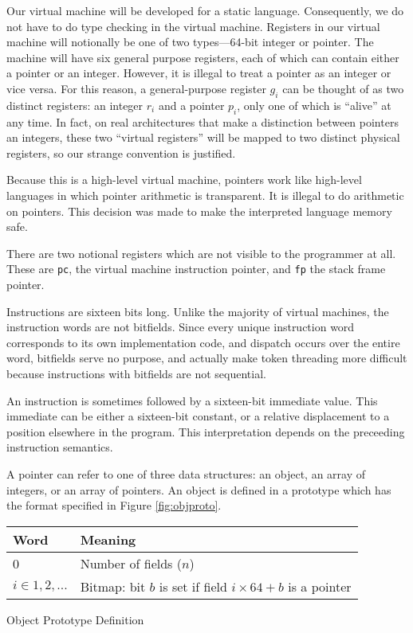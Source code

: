		Our virtual machine will be developed for a static language. Consequently, we do not have to do type checking in the virtual machine. Registers in our virtual machine will notionally be one of two types---64-bit integer or pointer. The machine will have six general purpose registers, each of which can contain either a pointer or an integer. However, it is illegal to treat a pointer as an integer or vice versa. For this reason, a general-purpose register $g_i$ can be thought of as two distinct registers: an integer $r_i$ and a pointer $p_i$, only one of which is ``alive'' at any time. In fact, on real architectures that make a distinction between pointers an integers, these two ``virtual registers'' will be mapped to two distinct physical registers, so our strange convention is justified.
		
		Because this is a high-level virtual machine, pointers work like high-level languages in which pointer arithmetic is transparent. It is illegal to do arithmetic on pointers. This decision was made to make the interpreted language memory safe.
		
		There are two notional registers which are not visible to the programmer at all. These are \texttt{pc}, the virtual machine instruction pointer, and \texttt{fp} the stack frame pointer.
		
		Instructions are sixteen bits long. Unlike the majority of virtual machines, the instruction words are not bitfields. Since every unique instruction word corresponds to its own implementation code, and dispatch occurs over the entire word, bitfields serve no purpose, and actually make token threading more difficult because instructions with bitfields are not sequential.
		
		An instruction is sometimes followed by a sixteen-bit immediate value. This immediate can be either a sixteen-bit constant, or a relative displacement to a position elsewhere in the program. This interpretation depends on the preceeding instruction semantics.
		
		A pointer can refer to one of three data structures: an object, an array of integers, or an array of pointers. An object is defined in a prototype which has the format specified in Figure \ref{fig:objproto}.
		
		\begin{myfigure}
			\begin{tabular}{|l|l| }
				\hline
				Word & Meaning \\
				\hline
				0 & Number of fields ($n$) \\
				\hline
				$i \in 1, 2, ...$ & Bitmap: bit $b$ is set if field $i\times64 + b$ is a pointer \\
				\hline
			\end{tabular}
			\caption{Object Prototype Definition}
			\label{fig:objproto}
		\end{myfigure}
			
